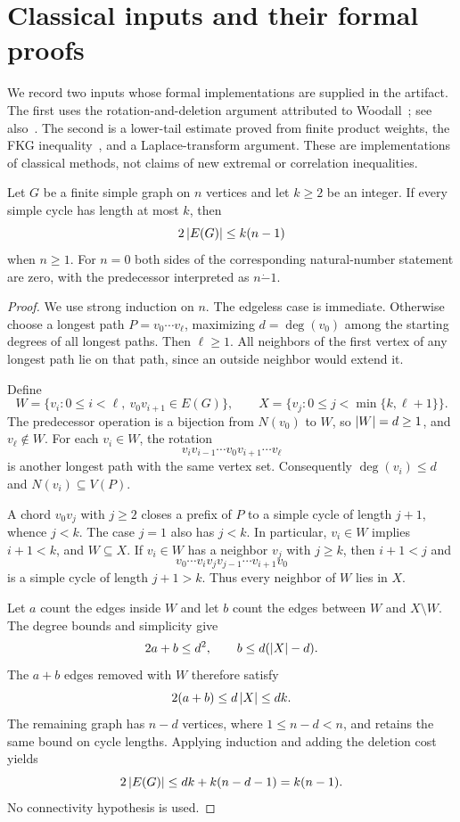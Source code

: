 \section{Classical inputs and their formal proofs}\label{sec:classical-inputs}
We record two inputs whose formal implementations are supplied in the
artifact. The first uses the rotation-and-deletion argument attributed to
Woodall~\cite{Woodall1972}; see also~\cite[Theorem 2.7.1]{Gunderson2022}.
The second is a lower-tail estimate proved from finite product weights,
the FKG inequality~\cite{FKG1971}, and a Laplace-transform argument.
These are implementations of classical methods, not claims of new
extremal or correlation inequalities.

\begin{lemma}\label{lem:eg-input}
Let $G$ be a finite simple graph on $n$ vertices and let $k\ge2$ be an
integer. If every simple cycle has length at most $k$, then
\[
                         2\left|E(G)\right|\le k(n-1)
\]
when $n\ge1$. For $n=0$ both sides of the corresponding natural-number
statement are zero, with the predecessor interpreted as $n\mathbin{\dot-}1$.
\end{lemma}
\begin{proof}
We use strong induction on $n$. The edgeless case is immediate. Otherwise
choose a longest path $P=v_0\cdots v_\ell$, maximizing $d=\deg(v_0)$ among
the starting degrees of all longest paths. Then $\ell\ge1$. All neighbors
of the first vertex of any longest path lie on that path, since an outside
neighbor would extend it.

Define
\[
 W=\{v_i:0\le i<\ell,\ v_0v_{i+1}\in E(G)\},\qquad
 X=\{v_j:0\le j<\min\{k,\ell+1\}\}.
\]
The predecessor operation is a bijection from $N(v_0)$ to $W$, so
$\left|W\right|=d\ge1$, and $v_\ell\notin W$. For each $v_i\in W$, the rotation
\[
             v_i v_{i-1}\cdots v_0v_{i+1}\cdots v_\ell
\]
is another longest path with the same vertex set. Consequently
$\deg(v_i)\le d$ and $N(v_i)\subseteq V(P)$.

A chord $v_0v_j$ with $j\ge2$ closes a prefix of $P$ to a simple cycle
of length $j+1$, whence $j<k$. The case $j=1$ also has $j<k$.
In particular, $v_i\in W$ implies $i+1<k$, and $W\subseteq X$.
If $v_i\in W$ has a neighbor $v_j$ with $j\ge k$, then $i+1<j$ and
\[
                v_0\cdots v_i v_j v_{j-1}\cdots v_{i+1}v_0
\]
is a simple cycle of length $j+1>k$. Thus every neighbor of $W$ lies in $X$.

Let $a$ count the edges inside $W$ and let $b$ count the edges between
$W$ and $X\setminus W$. The degree bounds and simplicity give
\[
             2a+b\le d^2,\qquad b\le d(\left|X\right|-d).
\]
The $a+b$ edges removed with $W$ therefore satisfy
\[
                     2(a+b)\le d\left|X\right|\le dk.
\]
The remaining graph has $n-d$ vertices, where $1\le n-d<n$, and retains
the same bound on cycle lengths. Applying induction and adding the
deletion cost yields
\[
 2\left|E(G)\right|\le dk+k(n-d-1)=k(n-1).
\]
No connectivity hypothesis is used.
\end{proof}

